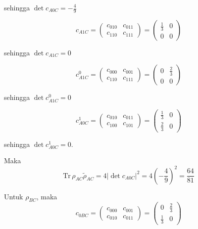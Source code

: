 sehingga $\det c_{A0C} = -\frac{4}{9}$

\begin{equation}
	c_{A1C}=
	\begin{pmatrix}
		c_{010} & c_{011} \\
		c_{110} & c_{111}
	\end{pmatrix}=
	\begin{pmatrix}
		\frac{1}{3} & 0 \\
		0 & 0
	\end{pmatrix}
\end{equation}

sehingga $\det c_{A1C} = 0$

\begin{equation}
	c_{A1C}^0=
	\begin{pmatrix}
		c_{000} & c_{001} \\
		c_{110} & c_{111}
	\end{pmatrix}=
	\begin{pmatrix}
		0 & \frac{2}{3} \\
		0 & 0
	\end{pmatrix}
\end{equation}

sehingga $\det c_{A1C}^0 = 0$

\begin{equation}
	c_{A0C}^1=
	\begin{pmatrix}
		c_{010} & c_{011} \\
		c_{100} & c_{101}
	\end{pmatrix}=
	\begin{pmatrix}
		\frac{1}{3} & 0 \\
		\frac{2}{3} & 0
	\end{pmatrix}
\end{equation}

sehingga $\det c_{A0C}^1 = 0$.

Maka
\begin{equation}
	\mathrm{Tr}\,\rho_{AC}\tilde{\rho}_{AC}=4|\det c_{A0C}|^2=4(-\frac{4}{9})^2=\frac{64}{81}
\end{equation}

Untuk $\rho_{BC}$, maka
\begin{equation}
	c_{0BC}=
	\begin{pmatrix}
		c_{000} & c_{001} \\
		c_{010} & c_{011}
	\end{pmatrix}=
	\begin{pmatrix}
		0 & \frac{2}{3} \\
		\frac{1}{3} & 0
	\end{pmatrix}
\end{equation}

